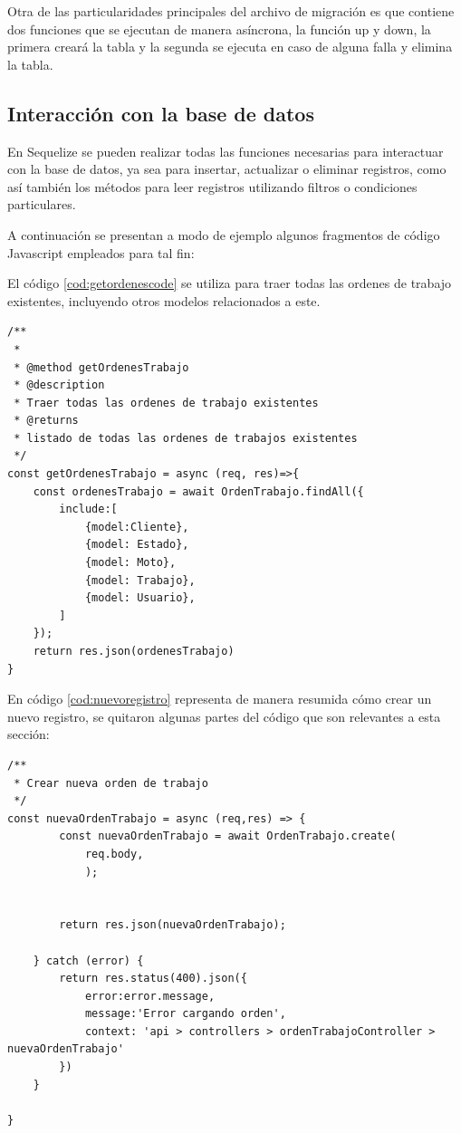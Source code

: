 Otra de las particularidades principales del archivo de migración es que contiene dos funciones que se ejecutan de manera asíncrona, la función up y down, la primera creará la tabla y la segunda se ejecuta en caso de alguna falla y elimina la tabla. 
  

\subsection{Interacción con la base de datos}
\label{subsec:interaccionbasededatos}

En Sequelize se pueden realizar todas las funciones necesarias para interactuar con la base de datos, ya sea para insertar, actualizar o eliminar registros, como así también los métodos para leer registros utilizando filtros o condiciones particulares.

A continuación se presentan a modo de ejemplo algunos fragmentos de código Javascript empleados para tal fin:

El código \ref{cod:getordenescode} se utiliza para traer todas las ordenes de trabajo existentes, incluyendo otros modelos relacionados a este.

\begin{lstlisting}[label=cod:getordenescode,caption= Código para traer datos en Sequelize.]
/**
 * 
 * @method getOrdenesTrabajo 
 * @description
 * Traer todas las ordenes de trabajo existentes
 * @returns
 * listado de todas las ordenes de trabajos existentes
 */
const getOrdenesTrabajo = async (req, res)=>{
    const ordenesTrabajo = await OrdenTrabajo.findAll({
        include:[
            {model:Cliente},
            {model: Estado},
            {model: Moto},
            {model: Trabajo},
            {model: Usuario},
        ]
    });
    return res.json(ordenesTrabajo)
}
\end{lstlisting}

En código \ref{cod:nuevoregistro} representa de manera resumida cómo crear un nuevo registro, se quitaron algunas partes del código que son relevantes a esta sección:

\begin{lstlisting}[label=cod:nuevoregistro,caption=Código resumido para crear nuevo registro en la base de datos.]
/**
 * Crear nueva orden de trabajo
 */
const nuevaOrdenTrabajo = async (req,res) => {
        const nuevaOrdenTrabajo = await OrdenTrabajo.create(
            req.body, 
            );
  

        return res.json(nuevaOrdenTrabajo);
        
    } catch (error) {
        return res.status(400).json({
            error:error.message, 
            message:'Error cargando orden',
            context: 'api > controllers > ordenTrabajoController > nuevaOrdenTrabajo'
        })  
    }
    
}
\end{lstlisting}

